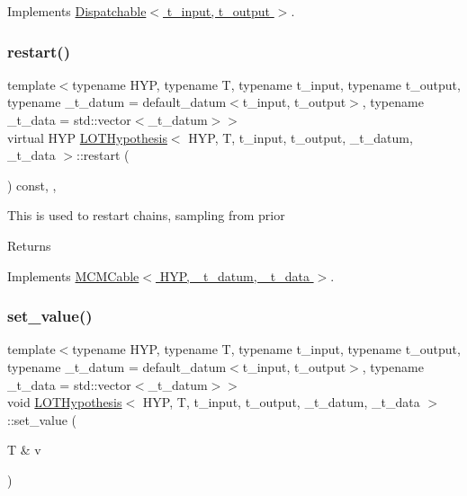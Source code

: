 Implements \hyperlink{class_dispatchable_a9339c2906f7c8dadbe1d0ca79dd9bb11}{Dispatchable$<$ t\+\_\+input, t\+\_\+output $>$}.

\mbox{\label{class_l_o_t_hypothesis_aec55db1efe43a1ce4bb4a2daacd0f1b7}} 
\subsubsection{\texorpdfstring{restart()}{restart()}}
{\footnotesize\ttfamily template$<$typename H\+YP, typename T, typename t\+\_\+input, typename t\+\_\+output, typename \+\_\+t\+\_\+datum = default\+\_\+datum$<$t\+\_\+input, t\+\_\+output$>$, typename \+\_\+t\+\_\+data = std\+::vector$<$\+\_\+t\+\_\+datum$>$$>$ \\
virtual H\+YP \hyperlink{class_l_o_t_hypothesis}{L\+O\+T\+Hypothesis}$<$ H\+YP, T, t\+\_\+input, t\+\_\+output, \+\_\+t\+\_\+datum, \+\_\+t\+\_\+data $>$\+::restart (\begin{DoxyParamCaption}{ }\end{DoxyParamCaption}) const\hspace{0.3cm}{\ttfamily [inline]}, {\ttfamily [override]}, {\ttfamily [virtual]}}

This is used to restart chains, sampling from prior \begin{DoxyReturn}{Returns}

\end{DoxyReturn}


Implements \hyperlink{class_m_c_m_cable_a220d6c4ca73e20441c14fa5bd3e090d3}{M\+C\+M\+Cable$<$ H\+Y\+P, \+\_\+t\+\_\+datum, \+\_\+t\+\_\+data $>$}.

\mbox{\label{class_l_o_t_hypothesis_a873355cca03609ac0ab405d29314e591}} 
\subsubsection{\texorpdfstring{set\+\_\+value()}{set\_value()}\hspace{0.1cm}{\footnotesize\ttfamily [1/2]}}
{\footnotesize\ttfamily template$<$typename H\+YP, typename T, typename t\+\_\+input, typename t\+\_\+output, typename \+\_\+t\+\_\+datum = default\+\_\+datum$<$t\+\_\+input, t\+\_\+output$>$, typename \+\_\+t\+\_\+data = std\+::vector$<$\+\_\+t\+\_\+datum$>$$>$ \\
void \hyperlink{class_l_o_t_hypothesis}{L\+O\+T\+Hypothesis}$<$ H\+YP, T, t\+\_\+input, t\+\_\+output, \+\_\+t\+\_\+datum, \+\_\+t\+\_\+data $>$\+::set\+\_\+value (\begin{DoxyParamCaption}\item[{T \&}]{v }\end{DoxyParamCaption})\hspace{0.3cm}{\ttfamily [inline]}}

